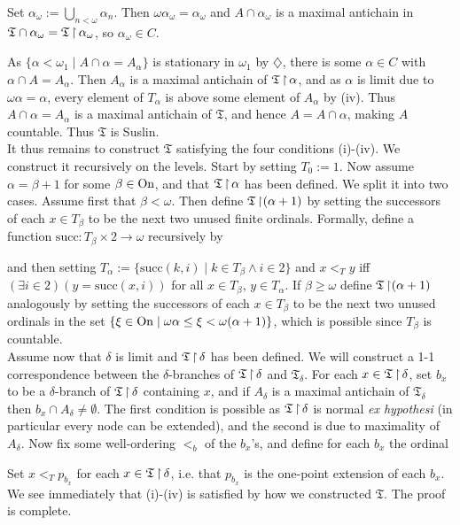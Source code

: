 {{Set $\alpha_\omega:=\bigcup_{n<\omega}\alpha_n$. Then $\omega\alpha_\omega=\alpha_\omega$ and $A\cap\alpha_\omega$ is a maximal antichain in $\mathfrak{T}\cap\alpha_\omega=\mathfrak{T}\operatorname{\upharpoonright}\alpha_\omega$, so $\alpha_\omega\in C$.
}

As $\{\alpha<\omega_1\mid A\cap\alpha=A_\alpha\}$ is stationary in $\omega_1$ by $\diamondsuit$, there is some $\alpha\in C$ with $\alpha\cap A=A_\alpha$. Then $A_\alpha$ is a maximal antichain of $\mathfrak{T}\operatorname{\upharpoonright}\alpha$, and as $\alpha$ is limit due to $\omega\alpha=\alpha$, every element of $T_\alpha$ is above some element of $A_\alpha$ by (iv). Thus $A\cap\alpha=A_\alpha$ is a maximal antichain of $\mathfrak{T}$, and hence $A=A\cap\alpha$, making $A$ countable. Thus $\mathfrak{T}$ is Suslin.\\

It thus remains to construct $\mathfrak{T}$ satisfying the four conditions (i)-(iv). We construct it recursively on the levels. Start by setting $T_0:=1$. Now assume $\alpha=\beta+1$ for some $\beta\in\operatorname{On}$, and that $\mathfrak{T}\operatorname{\upharpoonright}\alpha$ has been defined. We split it into two cases. Assume first that $\beta<\omega$. Then define $\mathfrak{T}\operatorname{\upharpoonright}(\alpha+1)$ by setting the successors of each $x\in T_\beta$ to be the next two unused finite ordinals. Formally, define a function $\text{succ}:T_\beta\times 2\to\omega$ recursively by

and then setting $T_\alpha:=\{\text{succ}(k,i)\mid k\in T_\beta\land i\in 2\}$ and $x<_Ty$ iff $(\exists i\in 2)(y=\text{succ}(x,i))$ for all $x\in T_\beta$, $y\in T_\alpha$. If $\beta\geq\omega$ define $\mathfrak{T}\operatorname{\upharpoonright}(\alpha+1)$ analogously by setting the successors of each $x\in T_\beta$ to be the next two unused ordinals in the set $\{\xi\in\operatorname{On}\mid\omega\alpha\leq\xi<\omega(\alpha+1)\}$, which is possible since $T_\beta$ is countable.\\

Assume now that $\delta$ is limit and $\mathfrak{T}\operatorname{\upharpoonright}\delta$ has been defined. We will construct a 1-1 correspondence between the $\delta$-branches of $\mathfrak{T}\operatorname{\upharpoonright}\delta$ and $\mathfrak{T}_\delta$. For each $x\in\mathfrak{T}\operatorname{\upharpoonright}\delta$, set $b_x$ to be a $\delta$-branch of $\mathfrak{T}\operatorname{\upharpoonright}\delta$ containing $x$, and if $A_\delta$ is a maximal antichain of $\mathfrak{T}_\delta$ then $b_x\cap A_\delta\neq\emptyset$. The first condition is possible as $\mathfrak{T}\operatorname{\upharpoonright}\delta$ is normal \textit{ex hypothesi} (in particular every node can be extended), and the second is due to maximality of $A_\delta$. Now fix some well-ordering $<_b$ of the $b_x$'s, and define for each $b_x$ the ordinal

Set $x<_Tp_{b_x}$ for each $x\in\mathfrak{T}\operatorname{\upharpoonright}\delta$, i.e. that $p_{b_x}$ is the one-point extension of each $b_x$. We see immediately that (i)-(iv) is satisfied by how we constructed $\mathfrak{T}$. The proof is complete.
}


